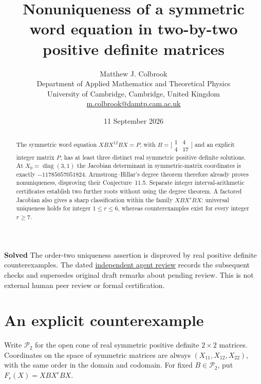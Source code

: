 \documentclass[11pt]{article}
\title{Nonuniqueness of a symmetric word equation in two-by-two positive definite matrices}
\author{Matthew J. Colbrook\\\small Department of Applied Mathematics and Theoretical Physics\\\small University of Cambridge, Cambridge, United Kingdom\\\small\href{mailto:m.colbrook@damtp.cam.ac.uk}{m.colbrook@damtp.cam.ac.uk}}
\date{11 September 2026}
\newcommand{\SPD}{\mathcal P_2}
\newcommand{\diag}{\operatorname{diag}}
\begin{document}
\maketitle

\noindent\textbf{Solved} The order-two uniqueness assertion is disproved by real positive definite counterexamples.
The dated \href{https://github.com/MColbrook/OpenProblemsInNLA/blob/codex/colbrook-matrix-function-resolutions/references/colbrook-matrix-functions-2026-09-11/verification/reviews/MF-16-review.md}{independent agent review} records the subsequent checks and supersedes original draft remarks about pending review. This is not external human peer review or formal certification.
\par\medskip

\begin{abstract}
The symmetric word equation $XBX^{12}BX=P$, with
$B=\bigl[\begin{smallmatrix}1&4\\4&17\end{smallmatrix}\bigr]$ and an explicit integer matrix $P$, has at least three distinct real symmetric positive definite solutions. At $X_0=\diag(3,1)$ the Jacobian determinant in symmetric-matrix coordinates is exactly $-11785057051824$. Armstrong--Hillar's degree theorem therefore already proves nonuniqueness, disproving their Conjecture~11.5. Separate integer interval-arithmetic certificates establish two further roots without using the degree theorem. A factored Jacobian also gives a sharp classification within the family $XBX^rBX$: universal uniqueness holds for integer $1\le r\le6$, whereas counterexamples exist for every integer $r\ge7$.
\end{abstract}

\section{An explicit counterexample}
Write $\SPD$ for the open cone of real symmetric positive definite $2\times2$ matrices. Coordinates on the space of symmetric matrices are always $(X_{11},X_{12},X_{22})$, with the same order in the domain and codomain. For fixed $B\in\SPD$, put $F_r(X)=XBX^rBX$.
\end{document}

